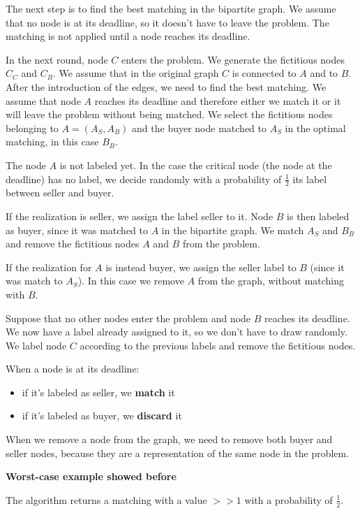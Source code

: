 \documentclass[10pt,a4paper]{article}
\begin{document}
The next step is to find the best matching in the bipartite graph. We assume that no node is at its deadline, so it doesn't have to leave the problem. The matching is not applied until a node reaches its deadline.

In the next round, node $C$ enters the problem. We generate the fictitious nodes $C_C$ and $C_B$. We assume that in the original graph $C$ is connected to $A$ and to $B$. After the introduction of the edges, we need to find the best matching. We assume that node $A$ reaches its deadline and therefore either we match it or it will leave the problem without being matched. We select the fictitious nodes belonging to $A =(A_S, A_B)$ and the buyer node matched to $A_S$ in the optimal matching, in this case $B_B$.

The node $A$ is not labeled yet. In the case the critical node (the node at the deadline) has no label, we decide randomly with a probability of $\frac{1}{2}$ its label between seller and buyer.

If the realization is seller, we assign the label seller to it. Node $B$ is then labeled as buyer, since it was matched to $A$ in the bipartite graph. We match $A_S$ and $B_B$ and remove the fictitious nodes $A$ and $B$ from the problem.

If the realization for $A$ is instead buyer, we assign the seller label to $B$ (since it was match to $A_S$). In this case we remove $A$ from the graph, without matching with $B$.

Suppose that no other nodes enter the problem and node $B$ reaches its deadline. We now have a label already assigned to it, so we don't have to draw randomly. We label node $C$ according to the previous labels and remove the fictitious nodes.

When a node is at its deadline:
\begin{itemize}
\item if it's labeled as seller, we \textbf{match} it
\item if it's labeled as buyer, we \textbf{discard} it
\end{itemize}

When we remove a node from the graph, we need to remove both buyer and seller nodes, because they are a representation of the same node in the problem.
\newline

\textbf{Worst-case example showed before}

The algorithm returns a matching with a value $>>1$ with a probability of $\frac{1}{2}$.
\end{document}

